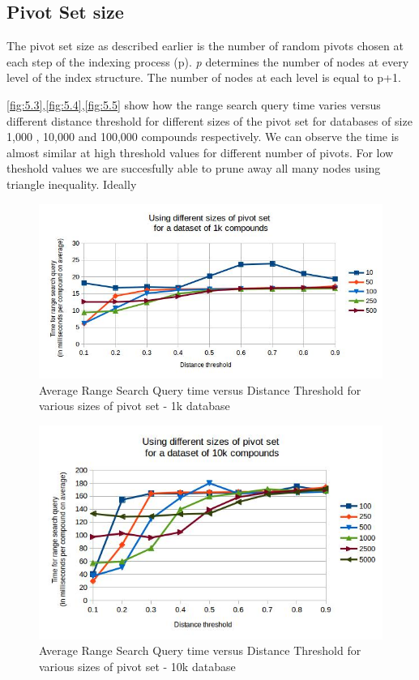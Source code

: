 \subsection{Pivot Set size}
The pivot set size as described earlier is the number of random pivots chosen at each step of the indexing process (p). \textit{p} determines the number of nodes at every level of the index structure. The number of nodes at each level is equal to p+1.

\autoref{fig:5.3},\autoref{fig:5.4},\autoref{fig:5.5}  show how the range search query time varies versus different distance threshold for different sizes of the pivot set for databases of size 1,000 , 10,000 and 100,000 compounds respectively. We can observe the time is almost similar at high threshold values for different number of pivots. For low theshold values we are succesfully able to prune away all many nodes using triangle inequality. Ideally 


\begin{figure}[ht!]	
\centering
\includegraphics[width=1 \columnwidth]{img/image2.jpg}
\caption{Average Range Search Query time versus Distance Threshold for various sizes of pivot set - 1k database}
\label{fig:5.3}
\end{figure}


\begin{figure}[ht!]	
\centering
\includegraphics[width=1 \columnwidth]{img/image3.jpg}
\caption{Average Range Search Query time versus Distance Threshold for various sizes of pivot set - 10k database}
\label{fig:5.4}
\end{figure}


